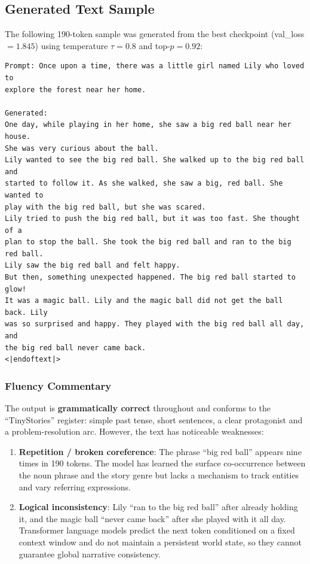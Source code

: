 \documentclass{article}
\begin{document}
\subsection{Generated Text Sample}

The following 190-token sample was generated from the best checkpoint
(val\_loss $= 1.845$) using temperature $\tau = 0.8$ and top-$p = 0.92$:

\vspace{0.5em}
\begin{lstlisting}
Prompt: Once upon a time, there was a little girl named Lily who loved to
explore the forest near her home.

Generated:
One day, while playing in her home, she saw a big red ball near her house.
She was very curious about the ball.
Lily wanted to see the big red ball. She walked up to the big red ball and
started to follow it. As she walked, she saw a big, red ball. She wanted to
play with the big red ball, but she was scared.
Lily tried to push the big red ball, but it was too fast. She thought of a
plan to stop the ball. She took the big red ball and ran to the big red ball.
Lily saw the big red ball and felt happy.
But then, something unexpected happened. The big red ball started to glow!
It was a magic ball. Lily and the magic ball did not get the ball back. Lily
was so surprised and happy. They played with the big red ball all day, and
the big red ball never came back.
<|endoftext|>
\end{lstlisting}

\subsubsection*{Fluency Commentary}

The output is \textbf{grammatically correct} throughout and conforms to the
``TinyStories'' register: simple past tense, short sentences, a clear
protagonist and a problem-resolution arc.  However, the text has noticeable
weaknesses:

\begin{enumerate}
  \item \textbf{Repetition / broken coreference}: The phrase ``big red ball''
        appears nine times in 190 tokens.  The model has learned the surface
        co-occurrence between the noun phrase and the story genre but lacks a
        mechanism to track entities and vary referring expressions.

  \item \textbf{Logical inconsistency}: Lily ``ran to the big red ball'' after
        already holding it, and the magic ball ``never came back'' after she
        played with it all day.  Transformer language models predict the next
        token conditioned on a fixed context window and do not maintain a
        persistent world state, so they cannot guarantee global narrative
        consistency.
\end{enumerate}
\end{document}
